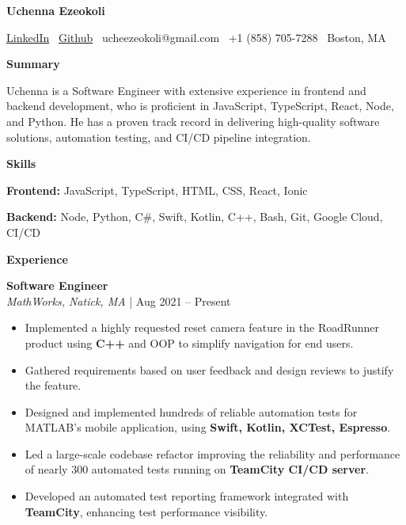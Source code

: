 \documentclass[10pt]{article}
\begin{document}
\begin{center}
    \textbf{Uchenna Ezeokoli}\\ 
    \hrulefill
\end{center}

\begin{center}
    \href{https://www.linkedin.com/in/uchenna-ezeokoli/}{LinkedIn} 
    \textbullet \ \href{https://github.com/ucheezeokoli}{Github} \textbullet \ ucheezeokoli@gmail.com \textbullet \ +1 (858) 705-7288 \textbullet \ Boston, MA 
\end{center}

\begin{center}
    \textbf{Summary}
    \hrulefill
\end{center}
Uchenna is a Software Engineer with extensive experience in frontend and backend development, who is proficient in JavaScript, TypeScript, React, Node, and Python. He has a proven track record in delivering high-quality software solutions, automation testing, and CI/CD pipeline integration.
\begin{center}
    \textbf{Skills}
    \hrulefill
\end{center}

\textbf{Frontend:} JavaScript, TypeScript, HTML, CSS, React, Ionic

\textbf{Backend:} Node, Python, C\#, Swift, Kotlin, C++, Bash, Git, Google Cloud, CI/CD

\begin{center}
    \textbf{Experience}
    \hrulefill
\end{center}

\textbf{Software Engineer}\\
\textit{MathWorks, Natick, MA} | Aug 2021 – Present

\begin{itemize}[noitemsep]
    \item Implemented a highly requested reset camera feature in the RoadRunner product using \textbf{C++} and OOP to simplify navigation for end users.
    \item Gathered requirements based on user feedback and design reviews to justify the feature.
    \item Designed and implemented hundreds of reliable automation tests for MATLAB’s mobile application,
    using \textbf{Swift, Kotlin, XCTest, Espresso}.
    \item Led a large-scale codebase refactor improving the reliability and performance of nearly 300 automated tests 
    running on \textbf{TeamCity CI/CD server}.
    \item Developed an automated test reporting framework integrated with \textbf{TeamCity}, enhancing test performance visibility.
\end{itemize}
\end{document}
